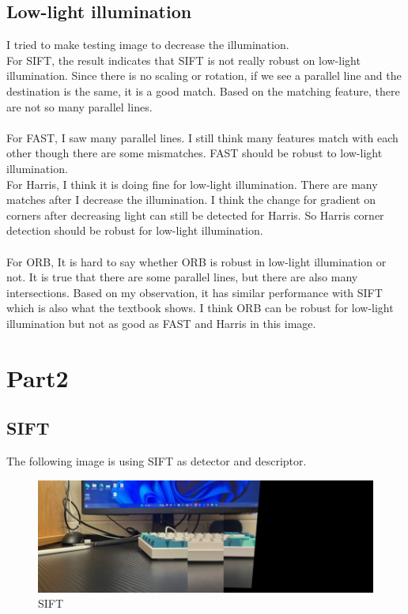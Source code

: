 \documentclass{article}
\begin{document}
\subsection*{Low-light illumination}
I tried to make testing image to decrease the illumination.\\
For SIFT, the result indicates that SIFT is not really robust on low-light illumination.
Since there is no scaling or rotation, if we see a parallel line and the destination is the same, it is a good match.
Based on the matching feature, there are not so many parallel lines.\\
\\
For FAST, I saw many parallel lines.
I still think many features match with each other though there are some mismatches.
FAST should be robust to low-light illumination.
\\
For Harris, I think it is doing fine for low-light illumination.
There are many matches after I decrease the illumination.
I think the change for gradient on corners after decreasing light can still be detected for Harris.
So Harris corner detection should be robust for low-light illumination.\\
\\
For ORB, It is hard to say whether ORB is robust in low-light illumination or not.
It is true that there are some parallel lines, but there are also many intersections.
Based on my observation, it has similar performance with SIFT which is also what the textbook shows.
I think ORB can be robust for low-light illumination but not as good as FAST and Harris in this image.

\section*{Part2}
\subsection*{SIFT}
The following image is using SIFT as detector and descriptor.
\begin{figure}[ht!]
  \begin{center}
    \includegraphics[scale=0.4]{SIFT-result.jpg}
    \caption[short]{SIFT}
    \label{fig:sift}
  \end{center} 
\end{figure}
\end{document}
